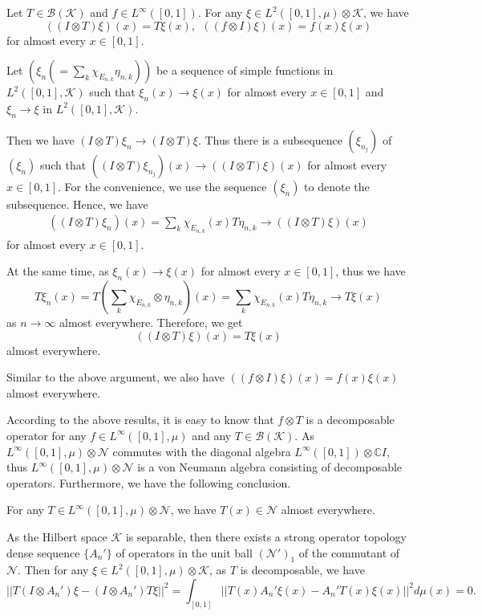 \documentclass[12pt]{article}
\begin{document}
\vskip6pt

 Let $T\in\mathcal{B}(\mathcal{K})$ and
$f\in L^{\infty}([0,1])$. For any $\xi\in
L^{2}([0,1],\mu)\otimes\mathcal{K}$, we have $$((I\otimes
T)\xi)(x)=T\xi(x), \  \ ((f\otimes I)\xi)(x)=f(x)\xi(x)$$ for almost
every $x\in [0,1]$.

\vskip6pt

 Let
$(\xi_{n}(=\sum_{k}\chi_{E_{n,k}}\eta_{n,k}))$ be a sequence of
simple functions in $L^{2}([0,1],\mathcal{K})$ such that
$\xi_{n}(x)\rightarrow\xi(x)$ for almost every $x\in [0,1]$ and
$\xi_{n}\rightarrow\xi$ in $L^{2}([0,1],\mathcal{K})$.

Then we have $(I\otimes T)\xi_{n}\rightarrow (I\otimes T)\xi$. Thus
there is a subsequence $(\xi_{n_{j}})$ of $(\xi_{n})$ such that
$((I\otimes T)\xi_{n_{j}})(x)\rightarrow ((I\otimes T)\xi)(x)$ for
almost every $x\in [0,1]$. For the convenience, we use the sequence
$(\xi_{n})$ to denote the subsequence. Hence, we have
\begin{align*}
((I\otimes
T)\xi_{n})(x)=\sum_{k}\chi_{E_{n,k}}(x)T\eta_{n,k}\rightarrow((I\otimes
T)\xi)(x)
\end{align*}
for almost every $x\in [0,1]$.

At the same time, as $\xi_{n}(x)\rightarrow\xi(x)$ for almost every
$x\in [0,1]$, thus we have
$$T\xi_{n}(x)=T(\sum_{k}\chi_{E_{n,k}}\otimes\eta_{n,k})(x)=\sum_{k}\chi_{E_{n,k}}(x)T\eta_{n,k}\rightarrow T\xi(x)$$
as $n\rightarrow\infty$ almost everywhere. Therefore, we get
$$((I\otimes T)\xi)(x)=T\xi(x)$$
almost everywhere.

Similar to the above argument, we also have $((f\otimes I)\xi)(x)=f(x)\xi(x)$ almost everywhere.
\endproof

According to the above results, it is easy to know that $f\otimes T$
is a decomposable operator for any $f\in L^{\infty}([0,1],\mu)$ and
any $T\in\mathcal{B}(\mathcal{K})$. As
$L^{\infty}([0,1],\mu)\otimes\mathcal{N}$ commutes with the diagonal
algebra $L^{\infty}([0,1])\otimes \mathbb{C}I$, thus
$L^{\infty}([0,1],\mu)\otimes\mathcal{N}$ is a von Neumann algebra
consisting of decomposable operators. Furthermore, we have the
following conclusion.

\vskip6pt

 For any $T\in
L^{\infty}([0,1],\mu)\otimes\mathcal{N}$, we have
$T(x)\in\mathcal{N}$ almost everywhere. \vskip6pt

 As the Hilbert space $\mathcal{K}$ is
separable, then there exists a strong operator topology dense
sequence $\{A_{n}'\}$ of operators in the unit ball
$(\mathcal{N}')_{1}$ of the commutant of $\mathcal{N}$. Then for any
$\xi\in L^{2}([0,1],\mu)\otimes\mathcal{K}$, as $T$ is decomposable,
we have
$$||T(I\otimes A_{n}')\xi-(I\otimes A_{n}')T\xi||^{2}=\int_{[0,1]}||T(x)A_{n}'\xi(x)-A_{n}'T(x)\xi(x)||^{2}d\mu(x)=0.$$
\end{document}

